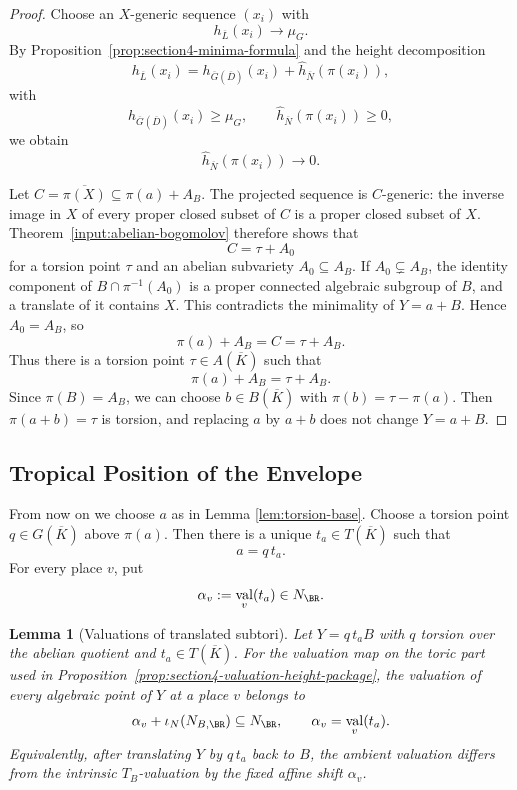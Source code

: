 \documentclass[10pt,a4paper]{amsart}
\theoremstyle{plain}
\newtheorem{lemma}[theorem]{Lemma}
\DeclareMathOperator{\val}{val}
\theoremstyle{plain}
\numberwithin{equation}{section}
\providecommand{\bD}{\overline{D}}
\providecommand{\bL}{\overline{L}}
\providecommand{\bN}{\overline{N}}
\begin{document}
\begin{proof}
	Choose an \(X\)-generic sequence \((x_i)\) with
	\[
	h_{\bL}(x_i)\to\mu_G.
	\]
	By Proposition~\ref{prop:section4-minima-formula} and the height decomposition
	\[
	h_{\bL}(x_i)
	=h_{\overline G(\bD)}(x_i)+\hat h_{\bN}(\pi(x_i)),
	\]
	with
	\[
	h_{\overline G(\bD)}(x_i)\ge\mu_G,
	\qquad
	\hat h_{\bN}(\pi(x_i))\ge0,
	\]
	we obtain
	\[
	\hat h_{\bN}(\pi(x_i))\to0.
	\]
	
	Let \(C=\overline{\pi(X)}\subseteq \pi(a)+A_B\).  The projected sequence is
	\(C\)-generic: the inverse image in \(X\) of every proper closed subset of
	\(C\) is a proper closed subset of \(X\).  Theorem~\ref{input:abelian-bogomolov}
	therefore shows that
	\[
	C=\tau+A_0
	\]
	for a torsion point \(\tau\) and an abelian subvariety \(A_0\subseteq A_B\).
	If \(A_0\subsetneq A_B\), the identity component of
	\(B\cap\pi^{-1}(A_0)\) is a proper connected algebraic subgroup of \(B\), and
	a translate of it contains \(X\).  This contradicts the minimality of
	\(Y=a+B\).  Hence \(A_0=A_B\), so
	\[
	\pi(a)+A_B=C=\tau+A_B.
	\]
	Thus there is a torsion
	point \(\tau\in A(\overline K)\) such that
	\[
	\pi(a)+A_B=\tau+A_B.
	\]
	Since \(\pi(B)=A_B\), we can choose \(b\in B(\overline K)\) with
	\(\pi(b)=\tau-\pi(a)\).  Then \(\pi(a+b)=\tau\) is torsion, and replacing
	\(a\) by \(a+b\) does not change \(Y=a+B\).
\end{proof}

\subsection{Tropical Position of the Envelope}

From now on we choose \(a\) as in Lemma \ref{lem:torsion-base}.  Choose a
torsion point \(q\in G(\overline{K})\) above \(\pi(a)\).  Then there is a unique
\(t_a\in T(\overline{K})\) such that
\[
a=q\,t_a.
\]
For every place \(v\), put
\[
\alpha_v:=\val_v(t_a)\in N_{\BR}.
\]

\begin{lemma}[Valuations of translated subtori]
	\label{lem:translated-subtorus-valuations}
	Let \(Y=q\,t_aB\) with \(q\) torsion over the abelian quotient and
	\(t_a\in T(\overline K)\).  For the valuation map on the toric part used in
	Proposition~\ref{prop:section4-valuation-height-package}, the valuation of
	every algebraic point of \(Y\) at a place \(v\) belongs to
	\[
	\alpha_v+\iota_N(N_{B,\BR})\subseteq N_\BR,
	\qquad
	\alpha_v=\val_v(t_a).
	\]
	Equivalently, after translating \(Y\) by \(q\,t_a\) back to \(B\), the ambient
	valuation differs from the intrinsic \(T_B\)-valuation by the fixed affine
	shift \(\alpha_v\).
\end{lemma}
\end{document}
